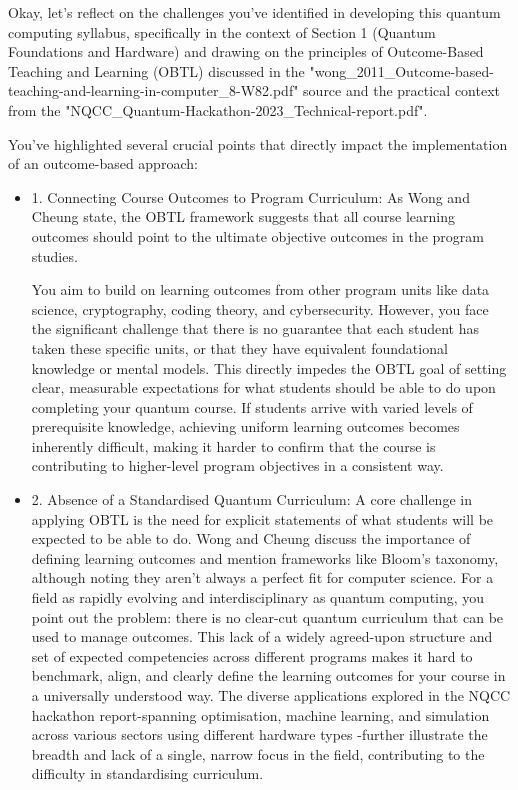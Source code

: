 \documentclass[11pt,a4paper]{article}
\begin{document}
Okay, let's reflect on the challenges you've identified in developing this quantum computing syllabus, specifically in the context of Section 1 (Quantum Foundations and Hardware) and drawing on the principles of Outcome-Based Teaching and Learning (OBTL) discussed in the "wong\_2011\_Outcome-based-teaching-and-learning-in-computer\_8-W82.pdf" source and the practical context from the "NQCC\_Quantum-Hackathon-2023\_Technical-report.pdf".

You've highlighted several crucial points that directly impact the implementation of an outcome-based approach:


\begin{itemize}	

\item 1.
Connecting Course Outcomes to Program Curriculum: As Wong and Cheung state, the OBTL framework suggests that all course learning outcomes should point to the ultimate objective outcomes in the program studies.

You aim to build on learning outcomes from other program units like data science, cryptography, coding theory, and cybersecurity. However, you face the significant challenge that there is no guarantee that each student has taken these specific units, or that they have equivalent foundational knowledge or mental models. This directly impedes the OBTL goal of setting clear, measurable expectations for what students should be able to do upon completing your quantum course. If students arrive with varied levels of prerequisite knowledge, achieving uniform learning outcomes becomes inherently difficult, making it harder to confirm that the course is contributing to higher-level program objectives in a consistent way.

\item 2. Absence of a Standardised Quantum Curriculum: A core challenge in applying OBTL is the need for explicit statements of what students will be expected to be able to do. Wong and Cheung discuss the importance of defining learning outcomes and mention frameworks like Bloom's taxonomy, although noting they aren't always a perfect fit for computer science. For a field as rapidly evolving and interdisciplinary as quantum computing, you point out the problem: there is no clear-cut quantum curriculum that can be used to manage outcomes. This lack of a widely agreed-upon structure and set of expected competencies across different programs makes it hard to benchmark, align, and clearly define the learning outcomes for your course in a universally understood way. The diverse applications explored in the NQCC hackathon report-spanning optimisation, machine learning, and simulation across various sectors using different hardware types
-further illustrate the breadth and lack of a single, narrow focus in the field, contributing to the difficulty in standardising curriculum.


\end{itemize}
\end{document}

